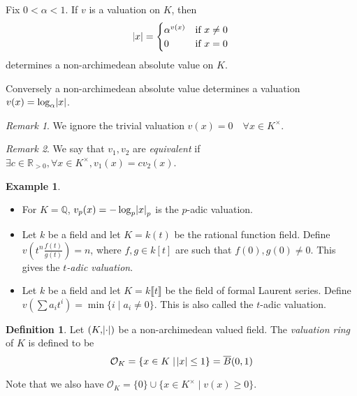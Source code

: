 \documentclass[11pt]{article}
\theoremstyle{definition}
\newtheorem{definition}{Definition}[subsection]
\newtheorem*{example}{Example}
\theoremstyle{plain}
\theoremstyle{remark}
\newtheorem*{remark}{Remark}
\newcommand{\QQ}{\mathbb{Q}}
\newcommand{\RR}{\mathbb{R}}
\newcommand{\cO}{\mathcal{O}}
\begin{document}
\noindent Fix $0 < \alpha < 1$. If $v$ is a valuation on $K$, then
\begin{equation*}
    \abs{x} =
    \begin{cases}
        \alpha^{v(x)} & \text{if } x \neq 0\\
        0 & \text{if } x = 0
    \end{cases}
\end{equation*}
determines a non-archimedean absolute value on $K$.

Conversely a non-archimedean absolute value determines a valuation $v(x) = \log_\alpha \abs{x}$.

\begin{remark}
    We ignore the trivial valuation $v(x) = 0 \quad \forall x \in K^\times$.
\end{remark}
\begin{remark}
    We say that $v_1, v_2$ are \emph{equivalent} if $\exists c \in \RR_{> 0}, \forall x \in K^\times, v_1(x) = c v_2(x)$.
\end{remark}

\begin{example}\phantom{}
    \begin{itemize}
        \item For $K = \QQ$, $v_p(x) = -\log_p \abs{x}_p$ is the $p$-adic valuation.
        \item Let $k$ be a field and let $K = k(t)$ be the rational function field. Define $v(t^n \frac{f(t)}{g(t)}) = n$, where $f, g \in k[t]$ are such that $f(0), g(0) \neq 0$. This gives the \emph{$t$-adic valuation}.
        \item Let $k$ be a field and let $K = k \llbracket t \rrbracket$ be the field of formal Laurent series. Define $v(\sum a_i t^i) = \min \{i \mid a_i \neq 0\}$. This is also called the $t$-adic valuation.
    \end{itemize}
\end{example}

\begin{definition}\label{def:2_2}
    Let $(K, \abs{\cdot})$ be a non-archimedean valued field. The \emph{valuation ring} of $K$ is defined to be
    \begin{equation*}
        \cO_K = \{x \in K \mid \abs{x} \le 1\} = \overline{B}(0, 1)
    \end{equation*}
\end{definition}
\noindent Note that we also have $\cO_K = \{0\} \cup \{x \in K^\times \mid v(x) \ge 0\}$.
\end{document}
